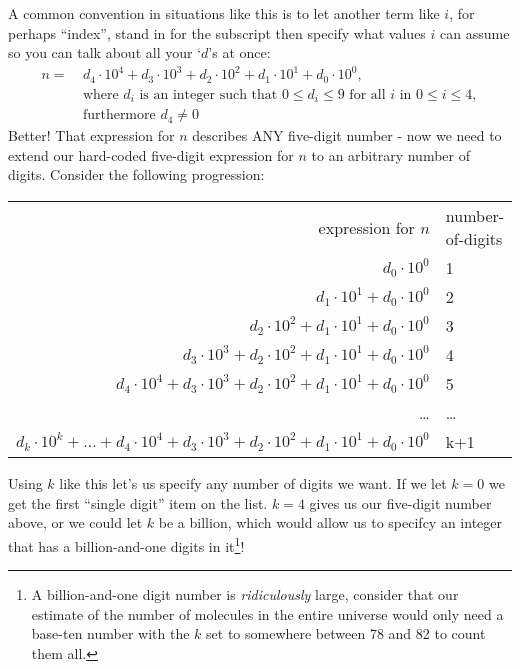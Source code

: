 \documentclass{article}
\begin{document}
A common convention in situations like this
is to let another term like $i$, for perhaps ``index'', stand in for the subscript then specify what values $i$ can assume
so you can talk about all your `$d$'s at once:
\begin{align*}
n =\ &d_4{\cdot}10^4+d_3{\cdot}10^3+d_2{\cdot}10^2+d_1{\cdot}10^1+d_0{\cdot}10^0,\\
& \text{where }
d_i
\text{ is an integer such that }
0\le{}d_i\le{}9
\text{ for all }i\text{ in }0\le{}i\le{}4,\\
& \text{furthermore }d_4\ne0
\end{align*}
%
%
%
Better! That expression for $n$ describes ANY five-digit number - now we need to extend
our hard-coded five-digit expression for $n$ to an arbitrary
number of digits.
Consider the following progression:
\begin{center}
\begin{tabular}{r l}
expression for $n$ & number-of-digits\\
$d_0{\cdot}10^0$ & 1\\
$d_1{\cdot}10^1+d_0{\cdot}10^0$ & 2\\
$d_2{\cdot}10^2+d_1{\cdot}10^1+d_0{\cdot}10^0$ & 3\\
$d_3{\cdot}10^3+d_2{\cdot}10^2+d_1{\cdot}10^1+d_0{\cdot}10^0$ & 4\\
$d_4{\cdot}10^4+d_3{\cdot}10^3+d_2{\cdot}10^2+d_1{\cdot}10^1+d_0{\cdot}10^0$ & 5\\
\dots{} & \dots{}\\
$d_k{\cdot}10^k+\dots{}+d_4{\cdot}10^4+d_3{\cdot}10^3+d_2{\cdot}10^2+d_1{\cdot}10^1+d_0{\cdot}10^0$ & k+1\\
\end{tabular}
\end{center}
Using $k$ like this let's us specify any number of digits we want.  If we let $k=0$ we get the first ``single digit'' 
item on the list.  $k=4$ gives us our five-digit number above, or we could let $k$ be a billion, which would allow
us to specifcy an integer that has a billion-and-one digits in it\footnote{A billion-and-one digit number is 
\emph{ridiculously} large,
consider that our estimate of the number of molecules in the entire universe would only need a base-ten
number with the $k$ set to somewhere between 78 and 82 to count them all.}!
\end{document}

